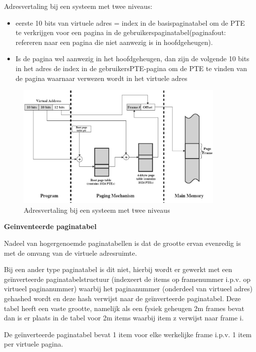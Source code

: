 Adresvertaling bij een systeem met twee niveaus:

\begin{itemize}
\item eerste 10 bits van virtuele adres = index in de basispaginatabel om de PTE te verkrijgen voor een pagina in de gebruikerspaginatabel(paginafout: refereren naar een pagina die niet aanwezig is in hoofdgeheugen).
\item Is de pagina wel aanwezig in het hoofdgeheugen, dan zijn de volgende 10 bits in het adres de index in de gebruikersPTE-pagina om de PTE te vinden van de pagina waarnaar verwezen wordt in het virtuele adres
\end{itemize}

\begin{figure}[htp]
    \centering
            \includegraphics[width=4in]{img/adresvertaling}
        \caption{Adresvertaling bij een systeem met twee niveaus}
    \label{fig:Adresvertaling bij een systeem met twee niveaus}
\end{figure}

\textbf{Geinventeerde paginatabel}

Nadeel van hogergenoemde paginatabellen is dat de grootte ervan evenredig is met de omvang van de virtuele adresruimte.

Bij een ander type paginatabel is dit niet, hierbij wordt er gewerkt met een geïnverteerde paginatabelstructuur (indexeert de items op framenummer i.p.v. op virtueel paginanummer) waarbij het paginanummer (onderdeel van virtueel adres) gehashed wordt en deze hash verwijst naar de geïnverteerde paginatabel. Deze tabel heeft een vaste grootte, namelijk als een fysiek geheugen 2m   frames bevat dan is er plaats in de tabel voor 2m items waarbij item z verwijst naar frame i.

De geïnverteerde paginatabel bevat 1 item voor elke werkelijke frame i.p.v. 1 item per virtuele pagina.

